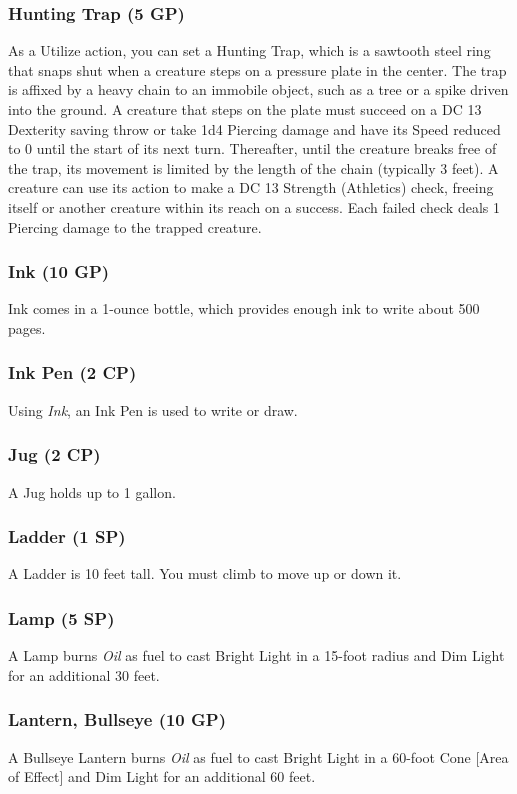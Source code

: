 \documentclass[10pt,a4paper,twoside,bg=print,twocolumn,openany,nodeprecatedcode]{dndbook}
\begin{document}
\subsubsection{Hunting Trap (5 GP)}
As a Utilize action, you can set a Hunting Trap, which is a sawtooth steel ring that snaps shut when a creature steps on a pressure plate in the center. The trap is affixed by a heavy chain to an immobile object, such as a tree or a spike driven into the ground. A creature that steps on the plate must succeed on a DC 13 Dexterity saving throw or take 1d4 Piercing damage and have its Speed reduced to 0 until the start of its next turn. Thereafter, until the creature breaks free of the trap, its movement is limited by the length of the chain (typically 3 feet). A creature can use its action to make a DC 13 Strength (Athletics) check, freeing itself or another creature within its reach on a success. Each failed check deals 1 Piercing damage to the trapped creature.

\subsubsection{Ink (10 GP)}
Ink comes in a 1-ounce bottle, which provides enough ink to write about 500 pages.

\subsubsection{Ink Pen (2 CP)}
Using \textit{Ink}, an Ink Pen is used to write or draw.

\subsubsection{Jug (2 CP)}
A Jug holds up to 1 gallon.

\subsubsection{Ladder (1 SP)}
A Ladder is 10 feet tall. You must climb to move up or down it.

\subsubsection{Lamp (5 SP)}
A Lamp burns \textit{Oil} as fuel to cast Bright Light in a 15-foot radius and Dim Light for an additional 30 feet.

\subsubsection{Lantern, Bullseye (10 GP)}
A Bullseye Lantern burns \textit{Oil} as fuel to cast Bright Light in a 60-foot Cone [Area of Effect] and Dim Light for an additional 60 feet.
\end{document}
